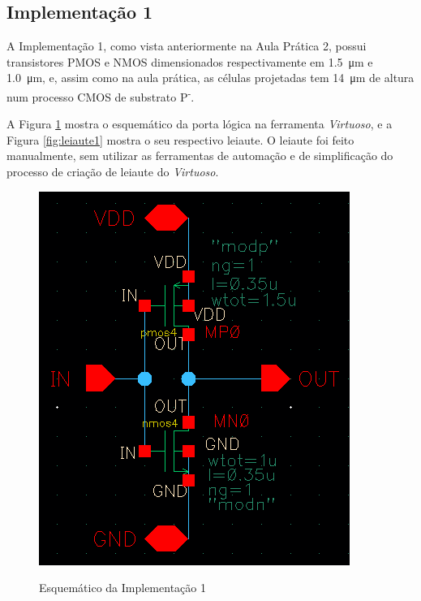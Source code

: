 \documentclass{iiufrgs}
\newcommand{\virtuoso}{\textit{Virtuoso}}
\begin{document}
\subsection{Implementação 1}\label{impl1}
A Implementação 1, como vista anteriormente na Aula Prática 2, possui transistores PMOS e NMOS dimensionados respectivamente em \SI{1.5}{\um} e \SI{1.0}{\um}, e, assim como na aula prática, as células projetadas tem \SI{14}{\um} de altura num processo CMOS de substrato P\textsuperscript{-}.

A Figura \ref{fig:esquematico1} mostra o esquemático da porta lógica na ferramenta \virtuoso, e a Figura \ref{fig:leiaute1} mostra o seu respectivo leiaute. O leiaute foi feito manualmente, sem utilizar as ferramentas de automação e de simplificação do processo de criação de leiaute do \virtuoso.

\begin{figure}[htbp]
    \centering
    \caption{Esquemático da Implementação 1}
    \includegraphics[scale=0.8]{images/esquematico1.png}
    \label{fig:esquematico1}
\end{figure}
\end{document}
